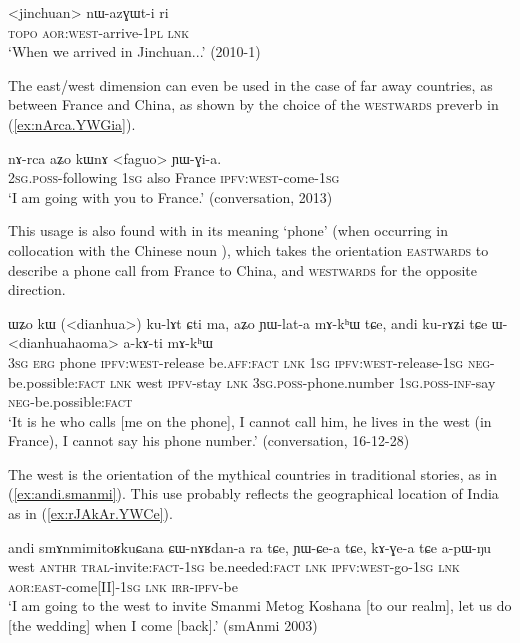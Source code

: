 \begin{exe}
\ex \label{ex:jinchuan.nazGWti}
\gll  <jinchuan> nɯ-azɣɯt-i ri \\
\textsc{topo} \textsc{aor}:\textsc{west}-arrive-\textsc{1pl} \textsc{lnk} \\
\glt `When we arrived in Jinchuan...' (2010-1)
\end{exe}

The east/west dimension can even be used in the case of far away countries, as between France and China, as shown by the choice of the \textsc{westwards} preverb in (\ref{ex:nArca.YWGia}). 

\begin{exe}
\ex \label{ex:nArca.YWGia}
\gll nɤ-rca aʑo kɯnɤ <faguo> ɲɯ-ɣi-a. \\
\textsc{2sg}.\textsc{poss}-following \textsc{1sg} also France \textsc{ipfv}:\textsc{west}-come-\textsc{1sg} \\ 
\glt `I am going with you to France.' (conversation, 2013)
\end{exe}

This usage is also found with  in its meaning `phone' (when occurring in collocation with the Chinese noun ), which takes the orientation \textsc{eastwards} to describe a phone call from France to China, and \textsc{westwards} for the opposite direction.

\begin{exe}
\ex \label{ex:kulAt.YWlata}
\gll ɯʑo kɯ (<dianhua>) ku-lɤt ɕti ma, aʑo ɲɯ-lat-a mɤ-kʰɯ tɕe, andi ku-rɤʑi tɕe ɯ-<dianhuahaoma> a-kɤ-ti mɤ-kʰɯ \\
\textsc{3sg} \textsc{erg} phone \textsc{ipfv}:\textsc{west}-release be.\textsc{aff}:\textsc{fact} \textsc{lnk} \textsc{1sg} \textsc{ipfv}:\textsc{west}-release-\textsc{1sg} \textsc{neg}-be.possible:\textsc{fact} \textsc{lnk} west \textsc{ipfv}-stay \textsc{lnk} \textsc{3sg}.\textsc{poss}-phone.number \textsc{1sg}.\textsc{poss}-\textsc{inf}-say \textsc{neg}-be.possible:\textsc{fact} \\
\glt `It is he who calls [me on the phone], I cannot call him, he lives in the west (in France), I cannot say his phone number.' (conversation, 16-12-28)
\end{exe}

The west is the orientation of the mythical countries in traditional stories, as in (\ref{ex:andi.smanmi}). This use probably reflects the geographical location of India as in (\ref{ex:rJAkAr.YWCe}).

\begin{exe}
\ex \label{ex:andi.smanmi}
\gll andi smɤnmimitoʁkuɕana ɕɯ-nɤʁdan-a ra tɕe, ɲɯ-ɕe-a tɕe, kɤ-ɣe-a tɕe a-pɯ-ŋu \\
west  \textsc{anthr} \textsc{tral}-invite:\textsc{fact}-\textsc{1sg} be.needed:\textsc{fact} \textsc{lnk} \textsc{ipfv}:\textsc{west}-go-\textsc{1sg} \textsc{lnk} \textsc{aor}:\textsc{east}-come[II]-\textsc{1sg} \textsc{lnk} \textsc{irr}-\textsc{ipfv}-be \\
\glt `I am going to the west to invite Smanmi Metog Koshana [to our realm], let us do [the wedding] when I come [back].' (smAnmi 2003)
\end{exe}


